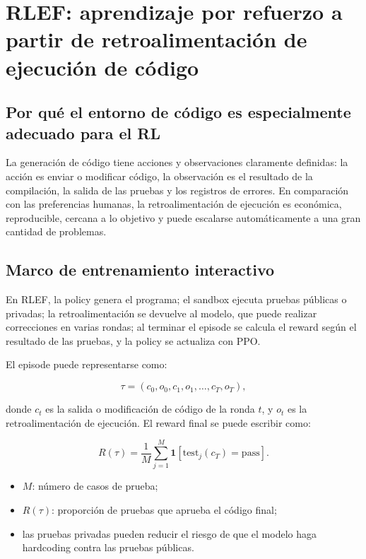 \section{RLEF: aprendizaje por refuerzo a partir de retroalimentación de ejecución de código}

\subsection{Por qué el entorno de código es especialmente adecuado para el RL}

La generación de código tiene acciones y observaciones claramente definidas: la acción es enviar o modificar código, la observación es el resultado de la compilación, la salida de las pruebas y los registros de errores. En comparación con las preferencias humanas, la retroalimentación de ejecución es económica, reproducible, cercana a lo objetivo y puede escalarse automáticamente a una gran cantidad de problemas.


\subsection{Marco de entrenamiento interactivo}

En RLEF, la policy genera el programa; el sandbox ejecuta pruebas públicas o privadas; la retroalimentación se devuelve al modelo, que puede realizar correcciones en varias rondas; al terminar el episode se calcula el reward según el resultado de las pruebas, y la policy se actualiza con PPO.


El episode puede representarse como:

$$
\tau=(c_0,o_0,c_1,o_1,\ldots,c_T,o_T),
$$

donde $c_t$ es la salida o modificación de código de la ronda $t$, y $o_t$ es la retroalimentación de ejecución. El reward final se puede escribir como:

$$
R(\tau)=\frac{1}{M}\sum_{j=1}^{M}\mathbf 1[\mathrm{test}_j(c_T)=\mathrm{pass}].
$$

\begin{itemize}
    \item $M$: número de casos de prueba;
    \item $R(\tau)$: proporción de pruebas que aprueba el código final;
    \item las pruebas privadas pueden reducir el riesgo de que el modelo haga hardcoding contra las pruebas públicas.
\end{itemize}

